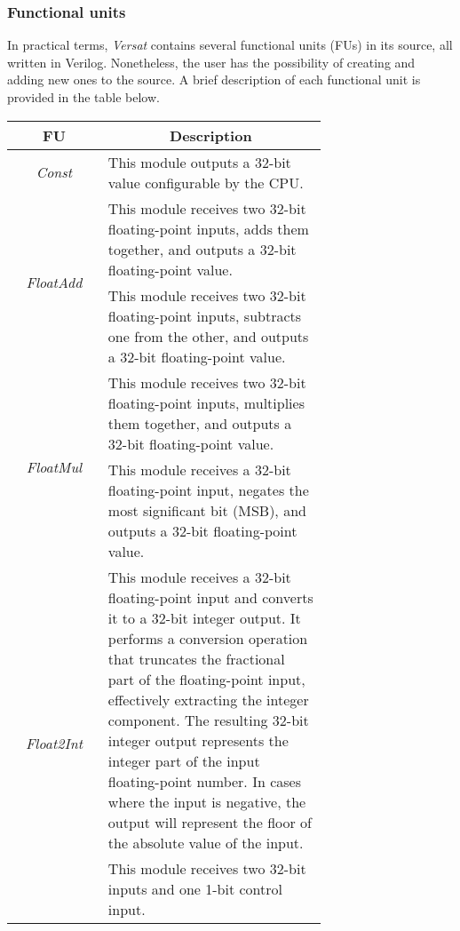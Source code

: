 \subsubsection{Functional units}
In practical terms, \textit{Versat} contains several functional units (FUs) in its source, all written in Verilog. Nonetheless, the user has the possibility of creating and adding new ones to the source. 
A brief description of each functional unit is provided in the table below.

\begin{table}[H]
    \centering
    \begin{tabular}{|c|p{0.7\linewidth}|}
        \hline
        \multicolumn{1}{|c|}{\textbf{FU}} & \multicolumn{1}{c|}{\textbf{Description}} \\
        \hline
        \multirow{1}{*}{\textit{Const}} & This module outputs a 32-bit value configurable by the CPU.  \\
        \hline
        \multirow{2}{*}{\textit{FloatAdd}} & This module receives two 32-bit floating-point inputs, adds them together, and outputs a 32-bit floating-point value. \\
        \hline
        \multirow{2}{*}{\textit{FloatSub}} & This module receives two 32-bit floating-point inputs, subtracts one from the other, and outputs a 32-bit floating-point value. \\
        \hline
        \multirow{2}{*}{\textit{FloatMul}} & This module receives two 32-bit floating-point inputs, multiplies them together, and outputs a 32-bit floating-point value. \\
        \hline
        \multirow{2}{*}{\textit{FloatNot}} & This module receives a 32-bit floating-point input, negates the most significant bit (MSB), and outputs a 32-bit floating-point value. \\
        \hline
        \multirow{6}{*}{\textit{Float2Int}} &  
        This module receives a 32-bit floating-point input and converts it to a 32-bit integer output. 
        It performs a conversion operation that truncates the fractional part of the floating-point input, effectively extracting the integer component. 
        The resulting 32-bit integer output represents the integer part of the input floating-point number. 
        In cases where the input is negative, the output will represent the floor of the absolute value of the input. \\
        \hline
        \multirow{4}{*}{\textit{Mux2}} & This module receives two 32-bit inputs and one 1-bit control input. 

\end{tabular}
\end{table}
